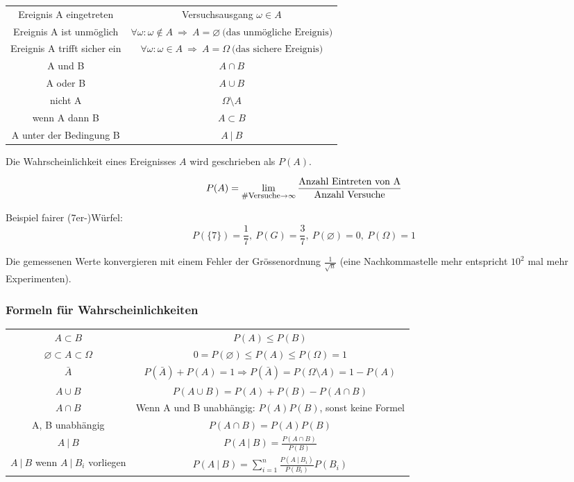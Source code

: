 \documentclass[10pt,a4paper]{scrartcl}
\begin{document}
\begin{center}
\begin{tabular}{cc}
Ereignis A eingetreten & Versuchsausgang $\omega \in A$ \\ 
Ereignis A ist unmöglich & $\forall \omega: \omega \notin A \ \Rightarrow \ A = \varnothing \ \mbox{(das unmögliche Ereignis)}$  \\ 
Ereignis A trifft sicher ein & $\forall \omega: \omega \in A \ \Rightarrow \ A = \Omega \ \mbox{(das sichere Ereignis)}$ \\ 
A und B & $A \cap B$ \\ 
A oder B & $A \cup B$ \\ 
nicht A & $\Omega \setminus A$ \\ 
wenn A dann B & $A \subset B$  \\ 
A unter der Bedingung B & $A\ |\ B$ \\
\end{tabular}
\end{center}

Die Wahrscheinlichkeit eines Ereignisses $A$ wird geschrieben als $P(A)$.

$$P(A) = \lim_{\mbox{\footnotesize\#Versuche} \rightarrow \infty} \frac{\mbox{Anzahl Eintreten von A}}{\mbox{Anzahl Versuche}}$$

Beispiel fairer (7er-)Würfel: $$P(\{7\}) = \frac{1}{7},\ P(G) = \frac{3}{7}, \ P(\varnothing) = 0, \ P(\Omega) = 1$$

Die gemessenen Werte konvergieren mit einem Fehler der Grössenordnung $\frac{1}{\sqrt{n}}$ (eine Nachkommastelle mehr entspricht $10^2$ mal mehr Experimenten).

\subsubsection{Formeln für Wahrscheinlichkeiten} 

\begin{center}
\begin{tabular}{cc}
$A \subset B$ & $P(A) \leq P(B)$ \\
$\varnothing \subset A \subset \Omega$ & $0 = P(\varnothing) \leq P(A) \leq P(\Omega) = 1$ \\
$\bar{A}$ & $P(\bar{A}) + P(A) = 1 \Rightarrow P(\bar{A}) = P(\Omega \setminus A) = 1 - P(A)$ \\
$A \cup B$ & $ P(A\cup B) = P(A) + P(B) - P(A\cap B)$ \\
$A \cap B$ & Wenn A und B unabhängig: $P(A)P(B)$, sonst keine Formel \\
A, B unabhängig & $P(A\cap B) = P(A)P(B)$\\[2pt]
$A\ |\ B$ & $P(A\ |\ B) = \frac{P(A\cap B)}{P(B)}$ \\[2pt]
$A\ |\ B$ wenn $A\ |\ B_i$ vorliegen & $ P(A\ |\ B) = \sum_{i=1}^n \frac{P(A\ |\ B_i)}{P(B_i)} P(B_i) $
\end{tabular}
\end{center}
\end{document}
